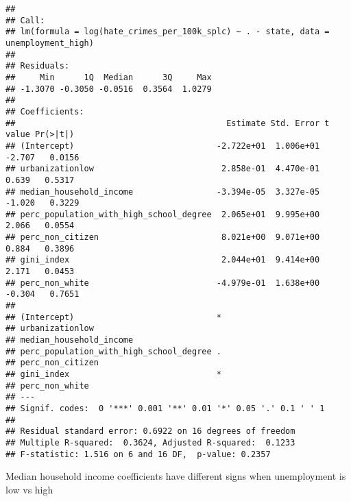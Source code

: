 \documentclass[
]{article}
\newenvironment{Shaded}{\begin{snugshade}}{\end{snugshade}}
\newcommand{\CommentTok}[1]{\textcolor[rgb]{0.56,0.35,0.01}{\textit{#1}}}
\newcommand{\DataTypeTok}[1]{\textcolor[rgb]{0.13,0.29,0.53}{#1}}
\newcommand{\KeywordTok}[1]{\textcolor[rgb]{0.13,0.29,0.53}{\textbf{#1}}}
\newcommand{\NormalTok}[1]{#1}
\newcommand{\OperatorTok}[1]{\textcolor[rgb]{0.81,0.36,0.00}{\textbf{#1}}}
\newcommand{\StringTok}[1]{\textcolor[rgb]{0.31,0.60,0.02}{#1}}
\begin{document}
\begin{verbatim}
## 
## Call:
## lm(formula = log(hate_crimes_per_100k_splc) ~ . - state, data = unemployment_high)
## 
## Residuals:
##     Min      1Q  Median      3Q     Max 
## -1.3070 -0.3050 -0.0516  0.3564  1.0279 
## 
## Coefficients:
##                                           Estimate Std. Error t value Pr(>|t|)
## (Intercept)                             -2.722e+01  1.006e+01  -2.707   0.0156
## urbanizationlow                          2.858e-01  4.470e-01   0.639   0.5317
## median_household_income                 -3.394e-05  3.327e-05  -1.020   0.3229
## perc_population_with_high_school_degree  2.065e+01  9.995e+00   2.066   0.0554
## perc_non_citizen                         8.021e+00  9.071e+00   0.884   0.3896
## gini_index                               2.044e+01  9.414e+00   2.171   0.0453
## perc_non_white                          -4.979e-01  1.638e+00  -0.304   0.7651
##                                          
## (Intercept)                             *
## urbanizationlow                          
## median_household_income                  
## perc_population_with_high_school_degree .
## perc_non_citizen                         
## gini_index                              *
## perc_non_white                           
## ---
## Signif. codes:  0 '***' 0.001 '**' 0.01 '*' 0.05 '.' 0.1 ' ' 1
## 
## Residual standard error: 0.6922 on 16 degrees of freedom
## Multiple R-squared:  0.3624, Adjusted R-squared:  0.1233 
## F-statistic: 1.516 on 6 and 16 DF,  p-value: 0.2357
\end{verbatim}

Median household income coefficients have different signs when
unemployment is low vs high

\begin{Shaded}
\end{Shaded}
\end{document}
